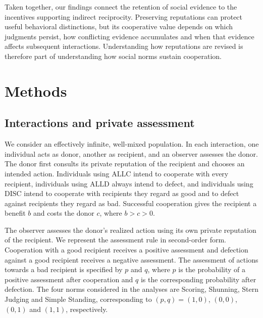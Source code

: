\documentclass[fleqn,10pt]{wlscirep}
\begin{document}
Taken together, our findings connect the retention of social
evidence to the incentives supporting indirect reciprocity.
Preserving reputations can protect useful behavioral distinctions,
but its cooperative value depends on which judgments persist,
how conflicting evidence accumulates and when that evidence affects
subsequent interactions. Understanding how reputations are revised
is therefore part of understanding how social norms sustain
cooperation.

\section*{Methods}\label{sec:methods}

\subsection*{Interactions and private assessment}

We consider an effectively infinite, well-mixed population. In each interaction, one individual acts as donor, another as recipient, and an observer assesses the donor. The donor first consults its private reputation of the recipient and chooses an intended action. Individuals using $\mathrm{ALLC}$ intend to cooperate with every recipient, individuals using $\mathrm{ALLD}$ always intend to defect, and individuals using $\mathrm{DISC}$ intend to cooperate with recipients they regard as good and to defect against recipients they regard as bad. Successful cooperation gives the recipient a benefit $b$ and costs the donor $c$, where $b>c>0$.

The observer assesses the donor's realized action using its own private reputation of the recipient. We represent the assessment rule in second-order form. Cooperation with a good recipient receives a positive assessment and defection against a good recipient receives a negative assessment. The assessment of actions towards a bad recipient is specified by $p$ and $q$, where $p$ is the probability of a positive assessment after cooperation and $q$ is the corresponding probability after defection. The four norms considered in the analyses are Scoring, Shunning, Stern Judging and Simple Standing, corresponding to $(p,q)=(1,0)$, $(0,0)$, $(0,1)$ and $(1,1)$, respectively.
\end{document}

